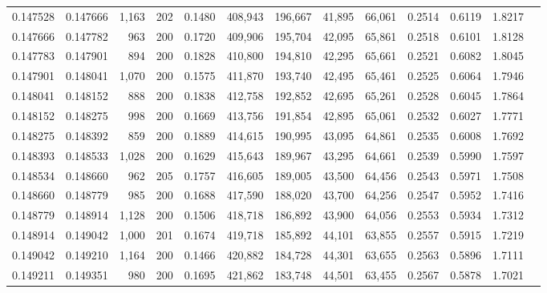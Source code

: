 \begin{tabular}{rrrrrrrrrrrrr}
0.147528 & 0.147666 &  1,163 & 202 &                                     0.1480 & 408,943 & 196,667 &  41,895 &  66,061 & 0.2514 & 0.6119 & 1.8217 \\
0.147666 & 0.147782 &    963 & 200 &                                     0.1720 & 409,906 & 195,704 &  42,095 &  65,861 & 0.2518 & 0.6101 & 1.8128 \\
0.147783 & 0.147901 &    894 & 200 &                                     0.1828 & 410,800 & 194,810 &  42,295 &  65,661 & 0.2521 & 0.6082 & 1.8045 \\
0.147901 & 0.148041 &  1,070 & 200 &                                     0.1575 & 411,870 & 193,740 &  42,495 &  65,461 & 0.2525 & 0.6064 & 1.7946 \\
0.148041 & 0.148152 &    888 & 200 &                                     0.1838 & 412,758 & 192,852 &  42,695 &  65,261 & 0.2528 & 0.6045 & 1.7864 \\
0.148152 & 0.148275 &    998 & 200 &                                     0.1669 & 413,756 & 191,854 &  42,895 &  65,061 & 0.2532 & 0.6027 & 1.7771 \\
0.148275 & 0.148392 &    859 & 200 &                                     0.1889 & 414,615 & 190,995 &  43,095 &  64,861 & 0.2535 & 0.6008 & 1.7692 \\
0.148393 & 0.148533 &  1,028 & 200 &                                     0.1629 & 415,643 & 189,967 &  43,295 &  64,661 & 0.2539 & 0.5990 & 1.7597 \\
0.148534 & 0.148660 &    962 & 205 &                                     0.1757 & 416,605 & 189,005 &  43,500 &  64,456 & 0.2543 & 0.5971 & 1.7508 \\
0.148660 & 0.148779 &    985 & 200 &                                     0.1688 & 417,590 & 188,020 &  43,700 &  64,256 & 0.2547 & 0.5952 & 1.7416 \\
0.148779 & 0.148914 &  1,128 & 200 &                                     0.1506 & 418,718 & 186,892 &  43,900 &  64,056 & 0.2553 & 0.5934 & 1.7312 \\
0.148914 & 0.149042 &  1,000 & 201 &                                     0.1674 & 419,718 & 185,892 &  44,101 &  63,855 & 0.2557 & 0.5915 & 1.7219 \\
0.149042 & 0.149210 &  1,164 & 200 &                                     0.1466 & 420,882 & 184,728 &  44,301 &  63,655 & 0.2563 & 0.5896 & 1.7111 \\
0.149211 & 0.149351 &    980 & 200 &                                     0.1695 & 421,862 & 183,748 &  44,501 &  63,455 & 0.2567 & 0.5878 & 1.7021 \\

\end{tabular}
